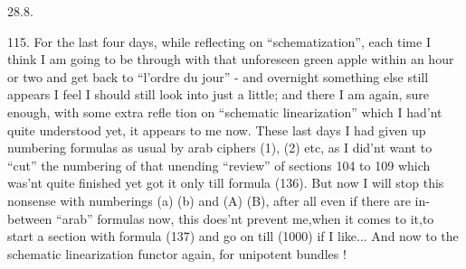 
28.8.

115.   For the last four days,  while reflecting on ``schematization'',
each time I think I am going to be through with that unforeseen green
apple within an hour or two\hand{,} and get back to ``l'ordre du jour'' -  and
overnight something else still appears I feel I should still look into
just a little;  and there I am again,  sure enough,  with some extra refle%
tion on ``schematic linearization'' which I had'nt quite understood yet,
it appears to me now.   These last days I had given up numbering formulas
as usual by arab ciphers (1), (2)  etc,  as I did'nt want to ``cut'' the
numbering of that unending ``review'' of sections 104 to 109 which was'nt
quite finished yet got it only till formula (136).  But now I will stop
this nonsense with numberings (a) (b) and (A) (B),  after all even if
there are in-between ``arab'' formulas now,  this does'nt prevent me,when
it comes to it,to start a  section with formula (137) and go on till
(1000) if I like...   And now to the schematic linearization functor
again,  for unipotent bundles !

